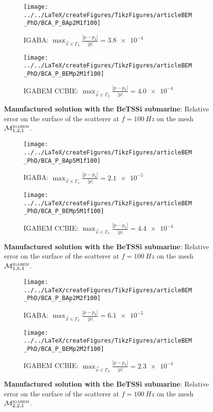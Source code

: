 \begin{figure}
	\centering
	\begin{subfigure}[t]{\textwidth}
		\texttt{[image: ../../LaTeX/createFigures/TikzFigures/articleBEM\_PhD/BCA\_P\_BAp2M1f100]}
		\caption{IGABA: $\displaystyle \max_{\vec{x}\in\Gamma_2}\frac{|p-p_h|}{|p|} = \num{3.8e-4}$}
	\end{subfigure} 
	\par\bigskip
	\begin{subfigure}[t]{\textwidth}
		\texttt{[image: ../../LaTeX/createFigures/TikzFigures/articleBEM\_PhD/BCA\_P\_BEMp2M1f100]}
		\caption{IGABEM CCBIE: $\displaystyle \max_{\vec{x}\in\Gamma_2}\frac{|p-p_h|}{|p|} = \num{4.0e-4}$}
	\end{subfigure} 
	\caption{\textbf{Manufactured solution with the BeTSSi submarine}: Relative error on the surface of the scatterer at $f=\SI{100}{Hz}$ on the mesh ${\cal M}_{1,2,1}^{\textsc{igabem}}$.}
	\label{Fig3:BCA_P_p2M1f100}
\end{figure}


\begin{figure}
	\centering
	\begin{subfigure}[t]{\textwidth}
		\texttt{[image: ../../LaTeX/createFigures/TikzFigures/articleBEM\_PhD/BCA\_P\_BAp5M1f100]}
		\caption{IGABA: $\displaystyle \max_{\vec{x}\in\Gamma_5}\frac{|p-p_h|}{|p|} = \num{2.1e-5}$}
	\end{subfigure} 
	\par\bigskip
	\begin{subfigure}[t]{\textwidth}
		\texttt{[image: ../../LaTeX/createFigures/TikzFigures/articleBEM\_PhD/BCA\_P\_BEMp5M1f100]}
		\caption{IGABEM CCBIE: $\displaystyle \max_{\vec{x}\in\Gamma_5}\frac{|p-p_h|}{|p|} = \num{4.4e-4}$}
	\end{subfigure} 
	\caption{\textbf{Manufactured solution with the BeTSSi submarine}: Relative error on the surface of the scatterer at $f=\SI{100}{Hz}$ on the mesh ${\cal M}_{1,5,4}^{\textsc{igabem}}$.}
	\label{Fig3:BCA_P_p5M1f100}
\end{figure}


\begin{figure}
	\centering
	\begin{subfigure}[t]{\textwidth}
		\texttt{[image: ../../LaTeX/createFigures/TikzFigures/articleBEM\_PhD/BCA\_P\_BAp2M2f100]}
		\caption{IGABA: $\displaystyle \max_{\vec{x}\in\Gamma_2}\frac{|p-p_h|}{|p|} = \num{6.1e-5}$}
	\end{subfigure} 
	\par\bigskip
	\begin{subfigure}[t]{\textwidth}
		\texttt{[image: ../../LaTeX/createFigures/TikzFigures/articleBEM\_PhD/BCA\_P\_BEMp2M2f100]}
		\caption{IGABEM CCBIE: $\displaystyle \max_{\vec{x}\in\Gamma_2}\frac{|p-p_h|}{|p|} = \num{2.3e-4}$}
	\end{subfigure} 
	\caption{\textbf{Manufactured solution with the BeTSSi submarine}: Relative error on the surface of the scatterer at $f=\SI{100}{Hz}$ on the mesh ${\cal M}_{2,2,1}^{\textsc{igabem}}$.}
	\label{Fig3:BCA_P_p2M2f100}
\end{figure}


